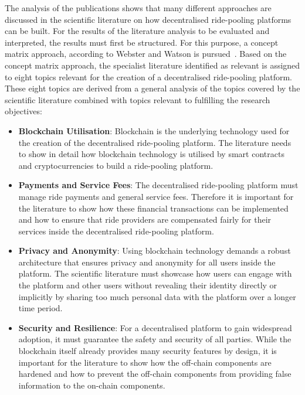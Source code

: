 The analysis of the publications shows that many different approaches are discussed in the scientific literature on how decentralised ride-pooling platforms can be built. For the results of the literature analysis to be evaluated and interpreted, the results must first be structured. For this purpose, a concept matrix approach, according to Webster and Watson is pursued~\cite{Webster.2002}. Based on the concept matrix approach, the specialist literature identified as relevant is assigned to eight topics relevant for the creation of a decentralised ride-pooling platform. These eight topics are derived from a general analysis of the topics covered by the scientific literature combined with topics relevant to fulfilling the research objectives:

\begin{itemize}
    \item \textbf{Blockchain Utilisation}: Blockchain is the underlying technology used for the creation of the decentralised ride-pooling platform. The literature needs to show in detail how blockchain technology is utilised by smart contracts and cryptocurrencies to build a ride-pooling platform.
    
    \item \textbf{Payments and Service Fees}: The decentralised ride-pooling platform must manage ride payments and general service fees. Therefore it is important for the literature to show how these financial transactions can be implemented and how to ensure that ride providers are compensated fairly for their services inside the decentralised ride-pooling platform.
    
    \item \textbf{Privacy and Anonymity}: Using blockchain technology demands a robust architecture that ensures privacy and anonymity for all users inside the platform. The scientific literature must showcase how users can engage with the platform and other users without revealing their identity directly or implicitly by sharing too much personal data with the platform over a longer time period.
    
    \item \textbf{Security and Resilience}: For a decentralised platform to gain widespread adoption, it must guarantee the safety and security of all parties. While the blockchain itself already provides many security features by design, it is important for the literature to show how the off-chain components are hardened and how to prevent the off-chain components from providing false information to the on-chain components.
    

\end{itemize}
